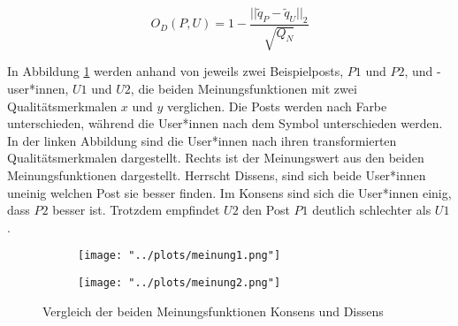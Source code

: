 \begin{equation}
\label{dissens}
O_D(P,U) = 1 - \frac{||\tilde{q}_P - \tilde{q}_U||_2}{\sqrt{Q_N}}
\end{equation}

\cleardoublepage
In Abbildung \ref{fig:vergleichmeinung} werden anhand von jeweils zwei Beispielposts, $P1$ und $P2$, und -user*innen, $U1$ und $U2$, die beiden Meinungsfunktionen mit zwei Qualitätsmerkmalen $x$ und $y$ verglichen. Die Posts werden nach Farbe unterschieden, während die User*innen nach dem Symbol unterschieden werden. In der linken Abbildung sind die User*innen nach ihren transformierten Qualitätsmerkmalen dargestellt. Rechts ist der Meinungswert aus den beiden Meinungsfunktionen dargestellt. Herrscht Dissens, sind sich beide User*innen uneinig welchen Post sie besser finden. Im Konsens sind sich die User*innen einig, dass $P2$ besser ist. Trotzdem empfindet $U2$ den Post $P1$ deutlich schlechter als $U1$.

\begin{figure}[!h]
	\begin{subfigure}{0.6\textwidth}
		\texttt{[image: "../plots/meinung1.png"]}
	\end{subfigure}
	\begin{subfigure}{0.4\textwidth}
		\texttt{[image: "../plots/meinung2.png"]}
	\end{subfigure}
	\caption{Vergleich der beiden Meinungsfunktionen Konsens und Dissens}
	\label{fig:vergleichmeinung}
\end{figure}



